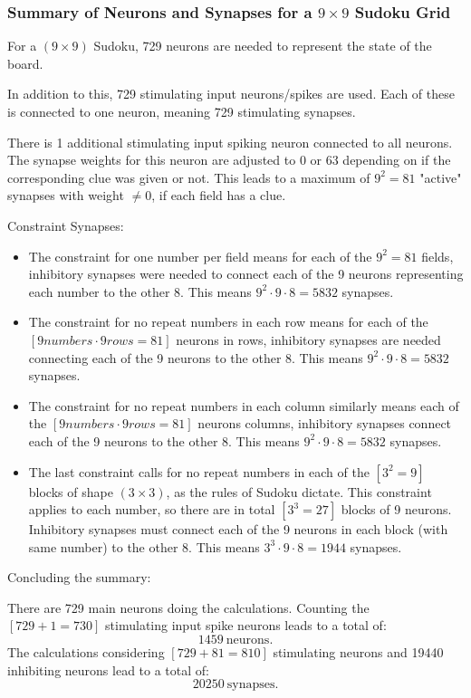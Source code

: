 
\subsubsection{Summary of Neurons and Synapses for a \( 9 \times 9 \) Sudoku Grid}

For a \( (9 \times 9) \) Sudoku, 729 neurons are needed to represent the state of the board.

In addition to this, 729 stimulating input neurons/spikes are used.
Each of these is connected to one neuron, meaning 729 stimulating synapses.

There is 1 additional stimulating input spiking neuron connected to all neurons.
The synapse weights for this neuron are adjusted to 0 or 63 depending on if the corresponding clue was given or not.
This leads to a maximum of \( 9^2 = 81 \) "active" synapses with weight \( ≠ 0 \), if each field has a clue.

Constraint Synapses:
\begin{itemize}
    \item The constraint for one number per field means for each of the \( 9^2 = 81 \) fields,
    inhibitory synapses were needed to connect each of the 9 neurons representing each number to the other 8.
    \subitem This means \( 9^2 \cdot 9 \cdot 8 = 5832 \) synapses.

    \item The constraint for no repeat numbers in each row means for each of the \( [9 numbers \cdot 9 rows = 81] \) neurons in rows,
    inhibitory synapses are needed connecting each of the 9 neurons to the other 8.
    \subitem This means \( 9^2 \cdot 9 \cdot 8 = 5832 \) synapses.

    \item The constraint for no repeat numbers in each column similarly means each of the \( [9 numbers \cdot 9 rows = 81] \) neurons columns,
    inhibitory synapses connect each of the 9 neurons to the other 8.
    \subitem This means \( 9^2 \cdot 9 \cdot 8 = 5832 \) synapses.

    \item The last constraint calls for no repeat numbers in each of the \( [3^2 = 9] \) blocks of shape \( (3 \times 3) \), as the rules of Sudoku dictate.
    This constraint applies to each number, so there are in total \( [3^3 = 27] \) blocks of 9 neurons.
    Inhibitory synapses must connect each of the 9 neurons in each block (with same number) to the other 8.
    \subitem This means \( 3^3 \cdot 9 \cdot 8 = 1944 \) synapses.
\end{itemize}

Concluding the summary:

There are 729 main neurons doing the calculations.
Counting the \( [729 + 1 = 730] \) stimulating input spike neurons leads to a total of:
\[1459 \ \text{neurons.}\]
The calculations considering \( [729 + 81 = 810] \) stimulating neurons and 19440 inhibiting neurons lead to a total of:
\[20250 \ \text{synapses.}\]